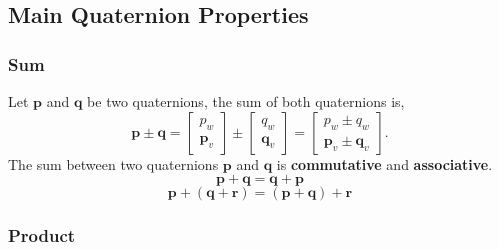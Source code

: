 \documentclass{report}
\renewcommand{\Vec}[1]{{\mathbf{#1}}}
\begin{document}
\subsection{Main Quaternion Properties}


\subsubsection{Sum}

Let $\Vec{p}$ and $\Vec{q}$ be two quaternions, the sum of both quaternions is,
%
\begin{equation}
  \Vec{p} \pm \Vec{q} =
  \begin{bmatrix} p_w \\ \Vec{p}_{v} \end{bmatrix}
  \pm
  \begin{bmatrix} q_w \\ \Vec{q}_{v} \end{bmatrix} =
  \begin{bmatrix} p_w \pm q_w \\ \Vec{p}_{v} \pm \Vec{q}_{v} \end{bmatrix}.
\end{equation}
%
The sum between two quaternions $\Vec{p}$ and $\Vec{q}$ is \textbf{commutative}
and \textbf{associative}.
%
\begin{equation}
  \Vec{p} + \Vec{q} = \Vec{q} + \Vec{p}
\end{equation}
%
\begin{equation}
  \Vec{p} + (\Vec{q} + \Vec{r}) = (\Vec{p} + \Vec{q}) + \Vec{r}
\end{equation}


\subsubsection{Product}
\end{document}
